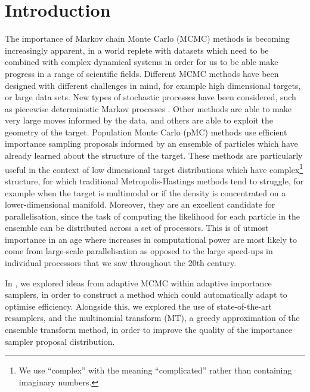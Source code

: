 \documentclass[final]{siamltex}
\begin{document}
\section{Introduction}
The importance of Markov chain Monte Carlo (MCMC) methods is becoming
increasingly apparent, in a world replete with datasets which need to be
combined with complex dynamical systems in order for us to be able
make progress in a range of scientific fields. Different MCMC methods
have been designed with different challenges in mind, for example high dimensional
targets\cite{cotter2013mcmc}, or large data
sets\cite{bierkens2016zig}. New types of stochastic processes
have been considered, such as piecewise deterministic Markov processes
\cite{bouchard2018bouncy}.
Other methods are able to make very large moves informed by the
data\cite{teh2016consistency,duane1987hybrid}, and others are able to exploit
the geometry of the target\cite{girolami2011riemann}. Population Monte Carlo
(pMC) methods use efficient importance sampling proposals informed by an
ensemble of particles which have already learned about the structure
of the target\cite{cappe2012population,cappe2008adaptive,douc2007convergence,douc2007minimum, martino2017layered, cornuet2012adaptive, martino2015adaptive}. These methods are particularly useful in the context of
low dimensional target distributions which have complex\footnote{We
  use ``complex'' with the meaning ``complicated'' rather than
  containing imaginary numbers.} structure, for
which traditional Metropolis-Hastings methods tend to struggle, for
example when the target is multimodal or if the density is
concentrated on a lower-dimensional manifold. Moreover, they are an
excellent candidate for parallelisation, since the task of computing
the likelihood for each particle in the ensemble can be distributed
across a set of processors. This is of utmost importance in an age
where increases in computational power are most likely to come from
large-scale parallelisation as opposed to the large speed-ups in
individual processors that we saw throughout the 20th century.

In \cite{cotter2015parallel}, we explored ideas from adaptive MCMC
within adaptive importance samplers, in order to construct a method which could automatically adapt to optimise
efficiency. Alongside this, we explored the use of state-of-the-art
resamplers\cite{reich2013nonparametric}, and the multinomial transform
(MT), a greedy approximation of the ensemble transform method, in order to improve the quality of
the importance sampler proposal distribution.
\end{document}
